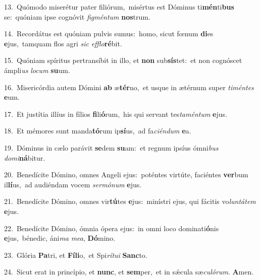 {\numbfont\textcolor{\numbcolor}{13.}}~Quómodo miserétur pater filiórum,~\dagger misértus est Dóminus ti\-\textbf{mén}\-ti\textbf{bus} se:~\star quóniam ipse cognóvit \textit{fig}\-\textit{mén}\textit{tum} \textbf{nos}\-trum.\par
{\numbfont\textcolor{\numbcolor}{14.}}~Recordátus est quóniam pulvis sumus:~\dagger homo, sicut fœnum \textbf{di}\-es \textbf{e}\-jus,~\star tamquam flos agri \textit{sic} \textit{ef}\-\textit{flo}\textbf{ré}bit.\par
{\numbfont\textcolor{\numbcolor}{15.}}~Quóniam spíritus pertransíbit in illo, et \textbf{non} sub\-\textbf{sís}\-tet:~\star et non cognóscet ámpli\textit{us} \textit{lo}\-\textit{cum} \textbf{su}\-um.\par
{\numbfont\textcolor{\numbcolor}{16.}}~Misericórdia autem Dómini \textbf{ab} æ\-\textbf{tér}\-no,~\star et usque in ætérnum super \textit{ti}\-\textit{mén}\textit{tes} \textbf{e}\-um.\par
{\numbfont\textcolor{\numbcolor}{17.}}~Et justítia illíus in fílios \textbf{fi}\-li\-\textbf{ó}\-rum,~\star his qui servant tes\-\textit{ta}\-\textit{mén}\textit{tum} \textbf{e}\-jus.\par
{\numbfont\textcolor{\numbcolor}{18.}}~Et mémores sunt manda\-\textbf{tó}\-rum ip\-\textbf{sí}\-us,~\star ad fa\-\textit{ci}\-\textit{én}\textit{dum} \textbf{e}\-a.\par
{\numbfont\textcolor{\numbcolor}{19.}}~Dóminus in cælo parávit \textbf{se}\-dem \textbf{su}\-am:~\star et regnum ipsíus ómni\textit{bus} \textit{do}\-\textit{mi}\textbf{ná}bitur.\par
{\numbfont\textcolor{\numbcolor}{20.}}~Benedícite Dómino, omnes Angeli ejus:~\dagger poténtes virtúte, faciéntes \textbf{ver}\-bum il\-\textbf{lí}\-us,~\star ad audiéndam vocem \textit{ser}\-\textit{mó}\textit{num} \textbf{e}\-jus.\par
{\numbfont\textcolor{\numbcolor}{21.}}~Benedícite Dómino, omnes vir\-\textbf{tú}\-tes \textbf{e}\-jus:~\star minístri ejus, qui fácitis vo\-\textit{lun}\-\textit{tá}\textit{tem} \textbf{e}\-jus.\par
{\numbfont\textcolor{\numbcolor}{22.}}~Benedícite Dómino, ómnia ópera ejus:~\dagger in omni loco dominati\-\textbf{ó}\-nis \textbf{e}\-jus,~\star bénedic, áni\textit{ma} \textit{me}\-\textit{a}, \textbf{Dó}\-mino.\par
{\numbfont\textcolor{\numbcolor}{23.}}~Glória \textbf{Pa}\-tri, et \textbf{Fí}\-\textbf{li}o,~\star et Spi\-\textit{rí}\-\textit{tu}\textit{i} \textbf{Sanc}\-to.\par
{\numbfont\textcolor{\numbcolor}{24.}}~Sicut erat in princípio, et \textbf{nunc}\-, et \textbf{sem}\-per,~\star et in sǽcula sæ\-\textit{cu}\-\textit{ló}\textit{rum}. \textbf{A}\-men.\par
